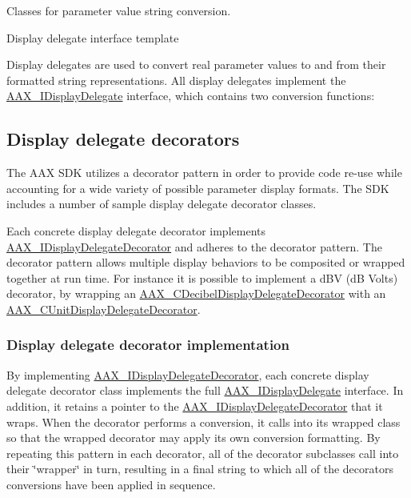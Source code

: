 Classes for parameter value string conversion. 

Display delegate interface template

Display delegates are used to convert real parameter values to and from their formatted string representations. All display delegates implement the \mbox{\hyperlink{a01801}{A\+A\+X\+\_\+\+I\+Display\+Delegate}} interface, which contains two conversion functions\+:


\begin{DoxyCode}{0}
\end{DoxyCode}
\hypertarget{a00816_displaydelegates_decorators}{}\subsection{Display delegate decorators}\label{a00816_displaydelegates_decorators}
The A\+AX S\+DK utilizes a decorator pattern in order to provide code re-\/use while accounting for a wide variety of possible parameter display formats. The S\+DK includes a number of sample display delegate decorator classes.

Each concrete display delegate decorator implements \mbox{\hyperlink{a01805}{A\+A\+X\+\_\+\+I\+Display\+Delegate\+Decorator}} and adheres to the decorator pattern. The decorator pattern allows multiple display behaviors to be composited or wrapped together at run time. For instance it is possible to implement a d\+BV (dB Volts) decorator, by wrapping an \mbox{\hyperlink{a01469}{A\+A\+X\+\_\+\+C\+Decibel\+Display\+Delegate\+Decorator}} with an \mbox{\hyperlink{a01585}{A\+A\+X\+\_\+\+C\+Unit\+Display\+Delegate\+Decorator}}.\hypertarget{a00816_displaydelegates_decorators_implementation}{}\subsubsection{Display delegate decorator implementation}\label{a00816_displaydelegates_decorators_implementation}
By implementing \mbox{\hyperlink{a01805}{A\+A\+X\+\_\+\+I\+Display\+Delegate\+Decorator}}, each concrete display delegate decorator class implements the full \mbox{\hyperlink{a01801}{A\+A\+X\+\_\+\+I\+Display\+Delegate}} interface. In addition, it retains a pointer to the \mbox{\hyperlink{a01805}{A\+A\+X\+\_\+\+I\+Display\+Delegate\+Decorator}} that it wraps. When the decorator performs a conversion, it calls into its wrapped class so that the wrapped decorator may apply its own conversion formatting. By repeating this pattern in each decorator, all of the decorator subclasses call into their \char`\"{}wrapper\char`\"{} in turn, resulting in a final string to which all of the decorators\textquotesingle{} conversions have been applied in sequence.

